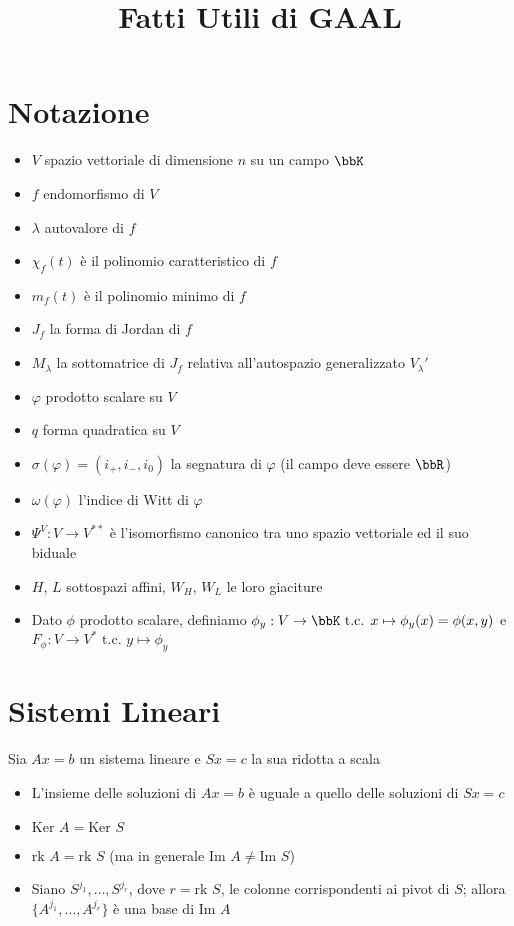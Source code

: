 \documentclass[a4paper,NoNotes]{stdmdoc}
\newcommand{\tc}{\mbox{ t.c. }}
\newcommand{\Ker}{\mbox{Ker } }
\newcommand{\Rk}{\mbox{rk }}
\newcommand{\Img}{\mbox{Im }}
\begin{document}
	\title{Fatti Utili di GAAL}
	\autodate

	\section*{Notazione}
	\begin{itemize}
		\item $V$ spazio vettoriale di dimensione $n$ su un campo $\bbK$
		\item $f$ endomorfismo di $V$
		\item $\lambda$ autovalore di $f$
		\item $\chi_f(t)$ è il polinomio caratteristico di $f$
		\item $m_f(t)$ è il polinomio minimo di $f$
		\item $J_f$ la forma di Jordan di $f$
		\item $M_\lambda$ la sottomatrice di $J_f$ relativa all'autospazio generalizzato $V_\lambda'$
		\item $\varphi$ prodotto scalare su $V$
		\item $q$ forma quadratica su $V$
		\item $\sigma(\varphi) = (i_{+}, i_{-}, i_0)$ la segnatura di $\varphi$ (il campo deve essere $\bbR$)
		\item $\omega(\varphi)$ l'indice di Witt di $\varphi$
		\item $\Psi^{V} : V \rightarrow V^{**}$ è l'isomorfismo canonico tra uno spazio vettoriale ed il suo biduale
		\item $H$, $L$ sottospazi affini, $W_H$, $W_L$ le loro giaciture
		\item Dato $\phi$ prodotto scalare, definiamo $\phi_y: V \rightarrow \bbK \tc x \mapsto \phi_y(x) = \phi(x,y)$ e $F_\phi: V \rightarrow V^{*} \tc y \mapsto \phi_y$
	\end{itemize}
	
	\section*{Sistemi Lineari}
	Sia $Ax = b$ un sistema lineare e $Sx = c$ la sua ridotta a scala
	\begin{itemize}
		\item L'insieme delle soluzioni di $Ax = b$ è uguale a quello delle soluzioni di $Sx = c$
		\item $\Ker A = \Ker S$
		\item $\Rk A = \Rk S$ (ma in generale $\Img A \neq \Img S$)
		\item Siano $S^{j_1}, \ldots, S^{j_r}$, dove $r = \Rk S$, le colonne corrispondenti ai pivot di $S$; allora $\{A^{j_1}, \ldots, A^{j_r}\}$ è una base di $\Img A$
	\end{itemize}
	
\end{document}
